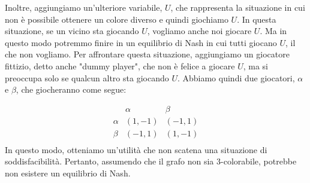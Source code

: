 Inoltre, aggiungiamo un'ulteriore variabile, $U$, che rappresenta la situazione
in cui non è possibile ottenere un colore diverso e quindi giochiamo $U$. In
questa situazione, se un vicino sta giocando $U$, vogliamo anche noi giocare
$U$. Ma in questo modo potremmo finire in un equilibrio di Nash in cui tutti
giocano $U$, il che non vogliamo. Per affrontare questa situazione, aggiungiamo
    un giocatore fittizio, detto anche "dummy player", che non è felice a giocare
$U$, ma si preoccupa solo se qualcun altro sta giocando $U$. Abbiamo quindi due
    giocatori, $\alpha$ e $\beta$, che giocheranno come segue:

\[
    \begin{array}{ccc}
               & \alpha & \beta  \\
        \alpha & (1,-1) & (-1,1) \\
        \beta  & (-1,1) & (1,-1) \\
    \end{array}
\]
In questo modo, otteniamo un'utilità che non scatena una situazione di
soddisfacibilità. Pertanto, assumendo che il grafo non sia 3-colorabile,
potrebbe non esistere un equilibrio di Nash.


